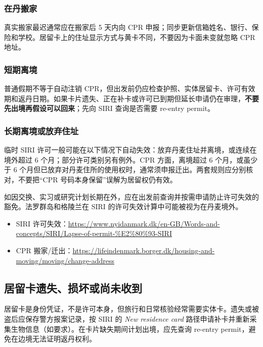 \subsubsection{在丹搬家}

真实搬家最迟通常应在搬家后 5 天内向 CPR 申报；同步更新信箱姓名、银行、保险和学校。居留卡上的住址显示方式与黄卡不同，不要因为卡面未变就忽略 CPR 地址。

\subsubsection{短期离境}

普通假期不等于自动注销 CPR，但出发前仍应检查护照、实体居留卡、许可有效期和返丹日期。如果卡片遗失、正在补卡或许可已到期但延长申请仍在审理，\textbf{不要先出境再假设可以回来}；先向 SIRI 查询是否需要 re-entry permit。

\subsubsection{长期离境或放弃住址}

临时 SIRI 许可一般可能在以下情况下自动失效：放弃丹麦住址并离境，或连续在境外超过 6 个月；部分许可类别另有例外。CPR 方面，离境超过 6 个月，或虽少于 6 个月但已放弃对丹麦住所的使用权时，通常须申报迁出。两套规则应分别核对，不要把“CPR 号码本身保留”误解为居留权仍有效。

如因交换、实习或研究计划长期在外，应在出发前查询并按需申请防止许可失效的豁免。法罗群岛和格陵兰在 SIRI 的许可失效计算中可能被视为在丹麦境外。

\begin{itemize}[leftmargin=2em,itemsep=2pt]
  \item SIRI 许可失效：\url{https://www.nyidanmark.dk/en-GB/Words-and-concepts/SIRI/Lapse-of-permit-%E2%80%93-SIRI}
  \item CPR 搬家/迁出：\url{https://lifeindenmark.borger.dk/housing-and-moving/moving/change-address}
\end{itemize}

\subsection{居留卡遗失、损坏或尚未收到}

居留卡是身份凭证，不是许可本身，但旅行和日常核验经常需要实体卡。遗失或被盗后应保存警方报案记录，按 SIRI 的 \emph{New residence card} 路径申请补卡并重新采集生物信息（如要求）。在卡片缺失期间计划出境，应先查询 re-entry permit，避免在边境无法证明返丹权利。

